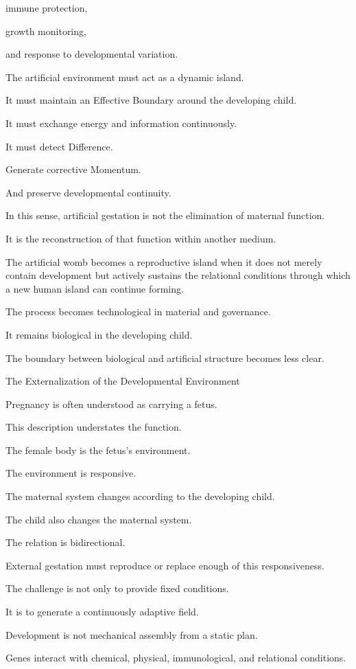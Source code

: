 immune protection,

growth monitoring,

and response to developmental variation.

The artificial environment must act as a dynamic island.

It must maintain an Effective Boundary around the developing child.

It must exchange energy and information continuously.

It must detect Difference.

Generate corrective Momentum.

And preserve developmental continuity.

In this sense, artificial gestation is not the elimination of maternal function.

It is the reconstruction of that function within another medium.

The artificial womb becomes a reproductive island when it does not merely contain development but actively sustains the relational conditions through which a new human island can continue forming.

The process becomes technological in material and governance.

It remains biological in the developing child.

The boundary between biological and artificial structure becomes less clear.

The Externalization of the Developmental Environment

Pregnancy is often understood as carrying a fetus.

This description understates the function.

The female body is the fetus’s environment.

The environment is responsive.

The maternal system changes according to the developing child.

The child also changes the maternal system.

The relation is bidirectional.

External gestation must reproduce or replace enough of this responsiveness.

The challenge is not only to provide fixed conditions.

It is to generate a continuously adaptive field.

Development is not mechanical assembly from a static plan.

Genes interact with chemical, physical, immunological, and relational conditions.

